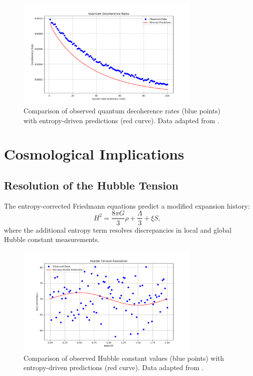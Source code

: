 \documentclass[12pt]{article}
\begin{document}
\begin{figure}[h!]
    \centering
    \includegraphics[width=0.8\textwidth]{quantum_coherence_observed_vs_model.png} %
    \caption{Comparison of observed quantum decoherence rates (blue points) with entropy-driven predictions (red curve). Data adapted from \cite{Kasevich2023}.}
    \label{fig:quantum_coherence_observed}
\end{figure}

\section{Cosmological Implications}
\subsection{Resolution of the Hubble Tension}
The entropy-corrected Friedmann equations predict a modified expansion history:
\begin{equation}
H^2 = \frac{8\pi G}{3} \rho + \frac{\Lambda}{3} + \xi S,
\end{equation}
where the additional entropy term resolves discrepancies in local and global Hubble constant measurements.

\begin{figure}[h!]
    \centering
    \includegraphics[width=0.8\textwidth]{hubble_tension_observed_vs_model.png} %
    \caption{Comparison of observed Hubble constant values (blue points) with entropy-driven predictions (red curve). Data adapted from \cite{Riess2021, Planck2020}.}
    \label{fig:hubble_tension_observed}
\end{figure}
\end{document}
